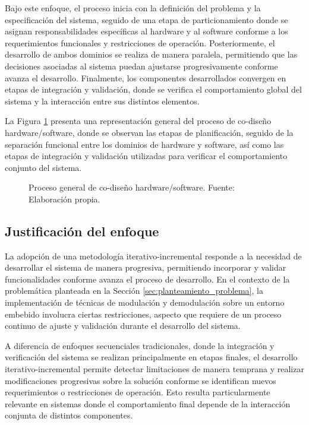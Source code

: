Bajo este enfoque, el proceso inicia con la definición del problema y la especificación del sistema, seguido de una etapa de particionamiento donde se asignan responsabilidades específicas al hardware y al software conforme a los requerimientos funcionales y restricciones de operación. Posteriormente, el desarrollo de ambos dominios se realiza de manera paralela, permitiendo que las decisiones asociadas al sistema puedan ajustarse progresivamente conforme avanza el desarrollo. Finalmente, los componentes desarrollados convergen en etapas de integración y validación, donde se verifica el comportamiento global del sistema y la interacción entre sus distintos elementos.

La Figura \ref{fig:metodologia} presenta una representación general del proceso de co-diseño hardware/software, donde se observan las etapas de planificación, seguido de la separación funcional entre los dominios de hardware y software, así como las etapas de integración y validación utilizadas para verificar el comportamiento conjunto del sistema.
\begin{figure}[H]
\centering
\resizebox{0.55\textwidth}{!}{
    \shorthandoff{<>}
    
    \shorthandon{<>}
}
\caption{Proceso general de co-diseño hardware/software. Fuente: Elaboración propia.}
\label{fig:metodologia}
\end{figure}


\subsection{Justificación del enfoque}

La adopción de una metodología iterativo-incremental responde a la necesidad de desarrollar el sistema de manera progresiva, permitiendo incorporar y validar funcionalidades conforme avanza el proceso de desarrollo. En el contexto de la problemática planteada en la Sección \ref{sec:planteamiento_problema}, la implementación de técnicas de modulación y demodulación sobre un entorno embebido involucra ciertas restricciones, aspecto que requiere de un proceso continuo de ajuste y validación durante el desarrollo del sistema.

A diferencia de enfoques secuenciales tradicionales, donde la integración y verificación del sistema se realizan principalmente en etapas finales, el desarrollo iterativo-incremental permite detectar limitaciones de manera temprana y realizar modificaciones progresivas sobre la solución conforme se identifican nuevos requerimientos o restricciones de operación. Esto resulta particularmente relevante en sistemas donde el comportamiento final depende de la interacción conjunta de distintos componentes.

